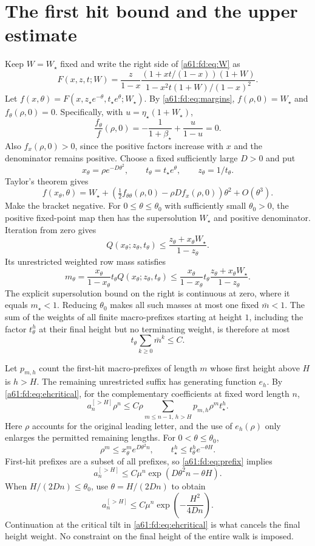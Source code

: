\documentclass[11pt,letterpaper]{article}
\numberwithin{equation}{section}
\theoremstyle{remark}\newtheorem{remark}[theorem]{Remark}
\newcommand{\st}{\star}
\begin{document}
\section{The first hit bound and the upper estimate}
Keep $W=W_\st$ fixed and write the right side of \eqref{a61:fd:eq:W} as
\[
 F(x,z,t;W)=\frac{z}{1-x}
 \frac{(1+xt/(1-x))(1+W)}{1-x^2t(1+W)/(1-x)^2}.
\]
Let $f(x,\theta)=F(x,z_\st e^{-\theta},t_\st e^\theta;W_\st)$. By \eqref{a61:fd:eq:margins}, $f(\rho,0)=W_\st$ and $f_\theta(\rho,0)=0$. Specifically, with $u=\eta_\st(1+W_\st)$,
\[
 \frac{f_\theta}{f}(\rho,0)
 =-\frac1{1+\beta_\st}+\frac{u}{1-u}=0.
\]
Also $f_x(\rho,0)>0$, since the positive factors increase with $x$ and the denominator remains positive. Choose a fixed sufficiently large $D>0$ and put
\[
 x_\theta=\rho e^{-D\theta^2},\qquad
 t_\theta=t_\st e^\theta,\qquad z_\theta=1/t_\theta.
\]
Taylor's theorem gives
\[
 f(x_\theta,\theta)=W_\st+
 \left(\tfrac12 f_{\theta\theta}(\rho,0)-\rho D f_x(\rho,0)\right)\theta^2
 +O(\theta^3).
\]
Make the bracket negative. For $0\le\theta\le\theta_0$ with sufficiently small $\theta_0>0$, the positive fixed-point map then has the supersolution $W_\st$ and positive denominator. Iteration from zero gives
\[
 Q(x_\theta;z_\theta,t_\theta)
 \le\frac{z_\theta+x_\theta W_\st}{1-z_\theta}.
\]
Its unrestricted weighted row mass satisfies
\[
 m_\theta=\frac{x_\theta}{1-x_\theta}t_\theta
 Q(x_\theta;z_\theta,t_\theta)
 \le \frac{x_\theta}{1-x_\theta}t_\theta
       \frac{z_\theta+x_\theta W_\st}{1-z_\theta}.
\]
The explicit supersolution bound on the right is continuous at zero, where it equals $m_\st<1$. Reducing $\theta_0$ makes all such masses at most one fixed $\bar m<1$. The sum of the weights of all finite macro-prefixes starting at height $1$, including the factor $t_\theta^h$ at their final height but no terminating weight, is therefore at most
\begin{equation}\label{a61:fd:eq:prefix}
 t_\theta\sum_{k\ge0}\bar m^k\le C.
\end{equation}

Let $p_{m,h}$ count the first-hit macro-prefixes of length $m$ whose first height above $H$ is $h>H$. The remaining unrestricted suffix has generating function $e_h$. By \eqref{a61:fd:eq:ehcritical}, for the complementary coefficients at fixed word length $n$,
\[
 a_n^{[>H]}\rho^n
 \le C\rho\sum_{m\le n-1,\,h>H}p_{m,h}\rho^m t_\st^h.
\]
Here $\rho$ accounts for the original leading letter, and the use of $e_h(\rho)$ only enlarges the permitted remaining lengths. For $0<\theta\le\theta_0$,
\[
 \rho^m\le x_\theta^m e^{D\theta^2n},\qquad
 t_\st^h\le t_\theta^h e^{-\theta H}.
\]
First-hit prefixes are a subset of all prefixes, so \eqref{a61:fd:eq:prefix} implies
\[
 a_n^{[>H]}\le C\mu^n\exp(D\theta^2n-\theta H).
\]
When $H/(2Dn)\le\theta_0$, use $\theta=H/(2Dn)$ to obtain
\begin{equation}\label{a61:fd:eq:hit}
 a_n^{[>H]}\le C\mu^n\exp\!\left(-\frac{H^2}{4Dn}\right).
\end{equation}
Continuation at the critical tilt in \eqref{a61:fd:eq:ehcritical} is what cancels the final height weight. No constraint on the final height of the entire walk is imposed.
\end{document}
